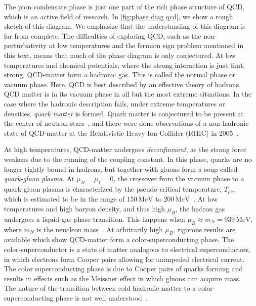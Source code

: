 The pion condensate phase is just one part of the rich phase structure of QCD, which is an active field of research.
In \autoref{fig:phase diag qcd}, we show a rough sketch of this diagram.
We emphasize that the understanding of this diagram is far from complete.
The difficulties of exploring QCD, such as the non-perturbativity at low temperatures and the fermion sign problem mentioned in this text, means that much of the phase diagram is only conjectured.
At low temperatures and chemical potentials, where the strong interaction is just that, strong, QCD-matter form a hadronic gas.
This is called the normal phase or vacuum phase.
Here, QCD is best described by an effective theory of hadrons.
QCD matter is in its vacuum phase in all but the most extreme situations.
In the case where the hadronic description fails, under extreme temperatures or densities, \emph{quark matter} is formed.
Quark matter is conjectured to be present at the center of neutron stars~\cite{from_hadrons_to_quarks}, and there were done observations of a non-hadronic state of QCD-matter at the Relativistic Heavy Ion Collider (RHIC) in 2005~\cite{2005:RHIC,2005:RHIC2}.

At high temperatures, QCD-matter undergoes \emph{deconfinment}, as the strong force weakens due to the running of the coupling constant.
In this phase, quarks are no longer tightly bound in hadrons, but together with gluons form a soup called \emph{quark-gluon plasma}.
At $\mu_B = \mu_I = 0$, the crossover from the vacuum phase to a quark-gluon plasma is characterized by the pseudo-critical temperature, $T_{pc}$, which is estimated to be in the range of $150 \, \text{MeV}$ to $200 \, \text{MeV}$~\cite{Fukushima:The_phase_diagram_of_dense_QCD}.
At low temperatures and high baryon density, and thus high $\mu_B$, the hadron gas undergoes a liquid-gas phase transition.
This happens when $\mu_B \approx m_N = 939 \, \text{MeV}$, where $m_N$ is the neucleon mass~\cite{Fukushima:The_phase_diagram_of_dense_QCD}.
At arbitrarily high $\mu_B$, rigorous results are available which show QCD-matter form a color-superconducting phase.
The color-superconductor is a state of matter analogous to electrical superconductors, in which electrons form Cooper pairs allowing for unimpeded electrical current.
The color superconducting phase is due to Cooper pairs of quarks forming and results in effects such as the Meissner effect in which gluons can acquire mass.
The nature of the transition between cold hadronic matter to a color-superconducting phase is not well understood~\cite{alford:color_superconductivity}.

